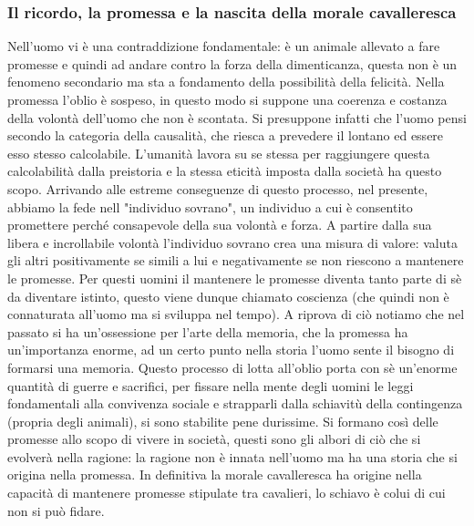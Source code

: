 \documentclass[10pt,a4paper]{article}
\begin{document}
\subsubsection{Il ricordo, la promessa e la nascita della morale cavalleresca}
Nell'uomo vi è una contraddizione fondamentale: è un animale allevato a fare promesse e quindi ad andare contro la forza della dimenticanza, questa non è un fenomeno secondario ma sta a fondamento della possibilità della felicità. Nella promessa l'oblio è sospeso, in questo modo si suppone una coerenza e costanza della volontà dell'uomo che non è scontata. Si presuppone infatti che l'uomo pensi secondo la categoria della causalità, che riesca a prevedere il lontano ed essere esso stesso calcolabile. L'umanità lavora su se stessa per raggiungere questa calcolabilità dalla preistoria e la stessa eticità imposta dalla società ha questo scopo. Arrivando alle estreme conseguenze di questo processo, nel presente, abbiamo la fede nell "individuo sovrano", un individuo a cui è consentito promettere perché consapevole della sua volontà e forza. A partire dalla sua libera e incrollabile volontà l'individuo sovrano crea una misura di valore: valuta gli altri positivamente se simili a lui e negativamente se non riescono a mantenere le promesse. Per questi uomini il mantenere le promesse diventa tanto parte di sè da diventare istinto, questo viene dunque chiamato coscienza (che quindi non è connaturata all'uomo ma si sviluppa nel tempo). A riprova di ciò notiamo che nel passato si ha un'ossessione per l'arte della memoria, che la promessa ha un'importanza enorme, ad un certo punto nella storia l'uomo sente il bisogno di formarsi una memoria. Questo processo di lotta all'oblio porta con sè un'enorme quantità di guerre e sacrifici, per fissare nella mente degli uomini le leggi fondamentali alla convivenza sociale e strapparli dalla schiavitù della contingenza (propria degli animali), si sono stabilite pene durissime. Si formano così delle promesse allo scopo di vivere in società, questi sono gli albori di ciò che si evolverà nella ragione: la ragione non è innata nell'uomo ma ha una storia che si origina nella promessa. In definitiva la morale cavalleresca ha origine nella capacità di mantenere promesse stipulate tra cavalieri, lo schiavo è colui di cui non si può fidare.\\
\end{document}
